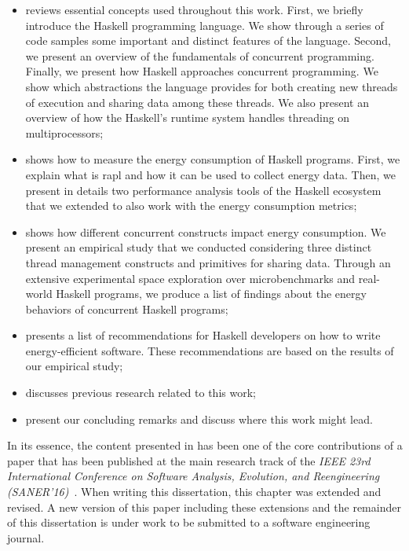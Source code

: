 \begin{itemize}
  \item \textbf{} reviews essential concepts used throughout this work. First, we briefly introduce the Haskell programming language. We show through a series of code samples some important and distinct features of the language. Second, we present an overview of the fundamentals of concurrent programming. Finally, we present how Haskell approaches concurrent programming. We show which abstractions the language provides for both creating new threads of execution and sharing data among these threads. We also present an overview of how the Haskell's runtime system handles threading on multiprocessors;

  \item \textbf{} shows how to measure the energy consumption of Haskell programs. First, we explain what is \acs{rapl} and how it can be used to collect energy data. Then, we present in details two performance analysis tools of the Haskell ecosystem that we extended to also work with the energy consumption metrics;

  \item \textbf{} shows how different concurrent constructs impact energy consumption. We present an empirical study that we conducted considering three distinct thread management constructs and primitives for sharing data. Through an extensive experimental space exploration over microbenchmarks and real-world Haskell programs, we produce a list of findings about the energy behaviors of concurrent Haskell programs;

  \item \textbf{} presents a list of recommendations for Haskell developers on how to write energy-efficient software. These recommendations are based on the results of our empirical study;

  \item \textbf{} discusses previous research related to this work;

  \item \textbf{} present our concluding remarks and discuss where this work might lead.
\end{itemize}

In its essence, the content presented in \textbf{} has been one of the core contributions of a paper that has been published at the main research track of the \emph{IEEE 23rd International Conference on Software Analysis, Evolution, and Reengineering (SANER'16)}~\cite{lima:2016}. When writing this dissertation, this chapter was extended and revised. A new version of this paper including these extensions and the remainder of this dissertation is under work to be submitted to a software engineering journal.
